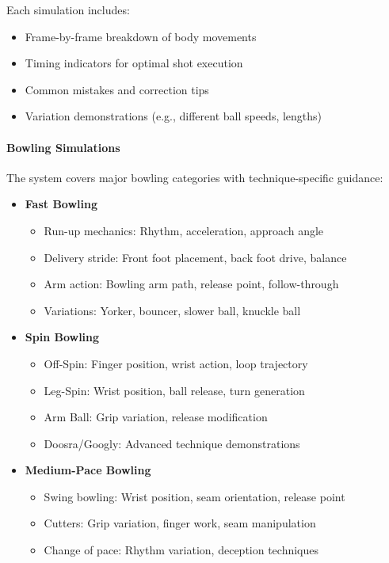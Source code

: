 \documentclass[12pt,a4paper]{article}
\begin{document}
\begin{enumerate}
Each simulation includes:
\begin{itemize}
    \item Frame-by-frame breakdown of body movements
    \item Timing indicators for optimal shot execution
    \item Common mistakes and correction tips
    \item Variation demonstrations (e.g., different ball speeds, lengths)
\end{itemize}

\paragraph{Bowling Simulations}
The system covers major bowling categories with technique-specific guidance:

\begin{itemize}
    \item \textbf{Fast Bowling}
    \begin{itemize}
        \item Run-up mechanics: Rhythm, acceleration, approach angle
        \item Delivery stride: Front foot placement, back foot drive, balance
        \item Arm action: Bowling arm path, release point, follow-through
        \item Variations: Yorker, bouncer, slower ball, knuckle ball
    \end{itemize}
    
    \item \textbf{Spin Bowling}
    \begin{itemize}
        \item Off-Spin: Finger position, wrist action, loop trajectory
        \item Leg-Spin: Wrist position, ball release, turn generation
        \item Arm Ball: Grip variation, release modification
        \item Doosra/Googly: Advanced technique demonstrations
    \end{itemize}
    
    \item \textbf{Medium-Pace Bowling}
    \begin{itemize}
        \item Swing bowling: Wrist position, seam orientation, release point
        \item Cutters: Grip variation, finger work, seam manipulation
        \item Change of pace: Rhythm variation, deception techniques
    \end{itemize}
\end{itemize}


\end{enumerate}
\end{document}
